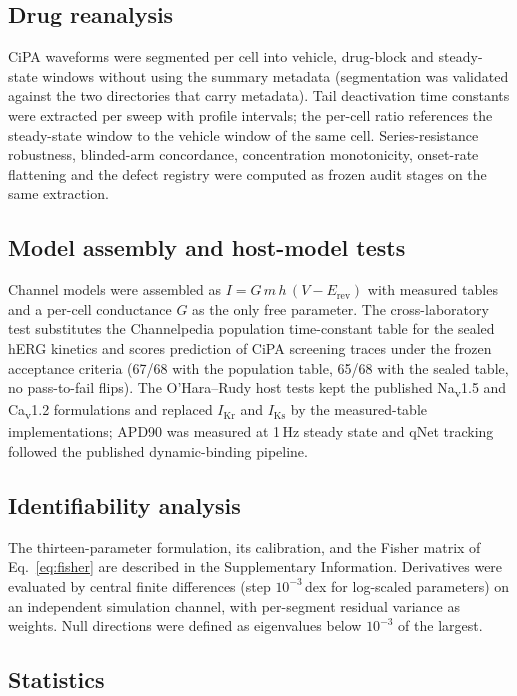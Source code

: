 \documentclass[11pt,a4paper]{article}
\begin{document}
\subsection{Drug reanalysis}

CiPA waveforms were segmented per cell into vehicle, drug-block and steady-state
windows without using the summary metadata (segmentation was validated against
the two directories that carry metadata). Tail deactivation time constants were
extracted per sweep with profile intervals; the per-cell ratio references the
steady-state window to the vehicle window of the same cell. Series-resistance
robustness, blinded-arm concordance, concentration monotonicity, onset-rate
flattening and the defect registry were computed as frozen audit stages on the
same extraction.

\subsection{Model assembly and host-model tests}

Channel models were assembled as $I = G\,m\,h\,(V-E_{\mathrm{rev}})$ with measured
tables and a per-cell conductance $G$ as the only free parameter. The
cross-laboratory test substitutes the Channelpedia population time-constant table
for the sealed hERG kinetics and scores prediction of CiPA screening traces under
the frozen acceptance criteria (67/68 with the population table, 65/68 with the
sealed table, no pass-to-fail flips). The O'Hara--Rudy host tests kept the
published Na\textsubscript{v}1.5 and Ca\textsubscript{v}1.2 formulations and
replaced $I_{\mathrm{Kr}}$ and $I_{\mathrm{Ks}}$ by the measured-table
implementations; APD90 was measured at 1\,Hz steady state and qNet tracking
followed the published dynamic-binding pipeline.

\subsection{Identifiability analysis}

The thirteen-parameter formulation, its calibration, and the Fisher matrix of
Eq.~\eqref{eq:fisher} are described in the Supplementary Information. Derivatives
were evaluated by central finite differences (step $10^{-3}$\,dex for log-scaled
parameters) on an independent simulation channel, with per-segment residual
variance as weights. Null directions were defined as eigenvalues below $10^{-3}$
of the largest.

\subsection{Statistics}
\end{document}
